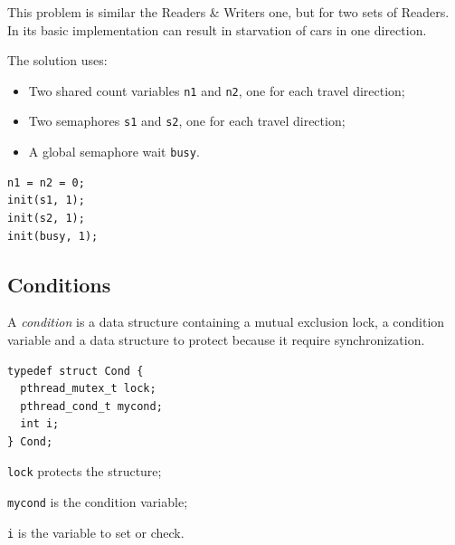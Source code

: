 This problem is similar the Readers \& Writers one, but for two sets of Readers. In its basic implementation can result in starvation of cars in one direction.

The solution uses:
\begin{itemize}
\item Two shared count variables \texttt{n1} and \texttt{n2}, one for each travel direction;
\item Two semaphores \texttt{s1} and \texttt{s2}, one for each travel direction;
\item A global semaphore wait \texttt{busy}.
\end{itemize}

\begin{verbatim}
n1 = n2 = 0;
init(s1, 1);
init(s2, 1);
init(busy, 1);
\end{verbatim}

\begin{Parallel}{}{}
\end{Parallel}

\subsection{Conditions}
A \emph{condition} is a data structure containing a mutual exclusion lock, a condition variable and a data structure to protect because it require synchronization.

\begin{verbatim}
typedef struct Cond {
  pthread_mutex_t lock;
  pthread_cond_t mycond;
  int i;
} Cond;
\end{verbatim}

\begin{description}
\item \texttt{lock} protects the structure;
\item \texttt{mycond} is the condition variable;
\item \texttt{i} is the variable to set or check.
\end{description}

